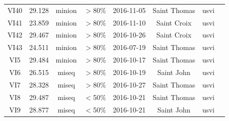 \documentclass[11pt,oneside,letterpaper]{article}
\begin{document}
\begin{table}
\begin{center}
\begin{tabular}{|c|c|c|c|c|c|c|c|}
   VI40 &   29.128 &        minion &            $>$80\% &      2016-11-05 &  Saint Thomas &    usvi \\
   VI41 &   23.859 &        minion &            $>$80\% &      2016-11-10 &   Saint Croix &    usvi \\
   VI42 &   29.467 &        minion &            $>$80\% &      2016-10-26 &   Saint Croix &    usvi \\
   VI43 &   24.511 &        minion &            $>$80\% &      2016-07-19 &  Saint Thomas &    usvi \\
    VI5 &   29.484 &        minion &            $>$80\% &      2016-10-17 &  Saint Thomas &    usvi \\
    VI6 &   26.515 &         miseq &            $>$80\% &      2016-10-19 &    Saint John &    usvi \\
    VI7 &   28.328 &         miseq &            $>$80\% &      2016-10-27 &  Saint Thomas &    usvi \\
    VI8 &   29.487 &         miseq &            $<$50\% &      2016-10-21 &  Saint Thomas &    usvi \\
    VI9 &   28.877 &         miseq &            $<$50\% &      2016-10-21 &    Saint John &    usvi \\
\bottomrule
\end{tabular}
\end{center}
\end{table} 



\end{document}
